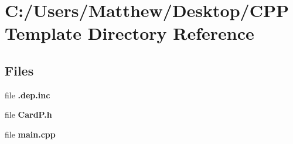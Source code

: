\section{C\+:/\+Users/\+Matthew/\+Desktop/\+C\+P\+P\+Template Directory Reference}
\label{dir_31b4a8d1330b7da0dfc02c5dcd118239}
\subsection*{Files}
\begin{DoxyCompactItemize}
\item 
file {\bf .\+dep.\+inc}
\item 
file {\bf Card\+P.\+h}
\item 
file {\bf main.\+cpp}
\end{DoxyCompactItemize}
